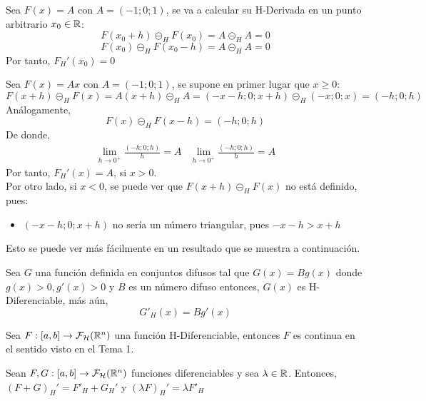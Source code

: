\begin{ejemplo}
	Sea $F(x)=A$ con $A=(-1;0;1)$, se va a calcular su H-Derivada en un punto arbitrario $x_0 \in \mathbb R$: 
	\[
		F(x_0 + h) \circleddash_H F(x_0) = A \circleddash_H A = 0
	\]
	\[
		F(x_0) \circleddash_H F(x_0 - h) = A \circleddash_H A = 0
	\]
	Por tanto, $F_H'(x_0) = 0$
\end{ejemplo}

\begin{ejemplo}
	\label{ejemplo:hukuhara}
	Sea $F(x)=A x$ con $A=(-1; 0; 1)$, se supone en primer lugar que $x \geq 0$:
	\[
		F(x + h) \circleddash_H F(x) = A(x + h) \circleddash_H A = (-x - h; 0; x+h) \circleddash_H (-x; 0; x) = (-h; 0; h)
	\]
	Análogamente, 
	\[
		F(x) \circleddash_H F(x - h) = (-h; 0; h)
	\]
	De donde,
	\[
	\begin{array}{c||c}
		\lim\limits_{h \rightarrow 0^+} \frac{(-h; 0; h)}{h}=A & \lim\limits_{h \rightarrow 0^+} \frac{(-h; 0; h)}{h}=A
	\end{array}
	\]
	Por tanto, $F_H'(x) = A $, si $x > 0$. \\
	Por otro lado, si $x<0$, se puede ver que $F(x+h) \circleddash_H F(x)$ no está definido, pues:
	
	\begin{itemize}
		\item $(-x-h; 0; x+h)$ no sería un número triangular, pues $-x-h > x+h$
	\end{itemize}

	Esto se puede ver más fácilmente en un resultado que se muestra a continuación.
\end{ejemplo}

\begin{proposicion}
	Sea $G$ una función definida en conjuntos difusos tal que $G(x)=B g(x)$ donde $g(x)>0, g'(x)>0$ y $B$ es un número difuso entonces, $G(x)$ es H-Diferenciable, más aún, 
	\[
		G'_H(x) = B g'(x)
	\]
\end{proposicion}

\begin{teorema} Sea  $F: [a, b] \rightarrow \mathcal{F}_\mathcal{H}(\mathbb R^n)$ una función H-Diferenciable, entonces $F$ es continua en el sentido visto en el Tema 1.
\end{teorema}

\begin{teorema}
	Sean $F, G : [a, b] \rightarrow \mathcal{F}_\mathcal{H}(\mathbb R^n)$ funciones diferenciables y sea $\lambda \in \mathbb R$. Entonces, $(F+G)_H' = F'_H + G_H'$ y $(\lambda F)_H' = \lambda F'_H$
\end{teorema}

